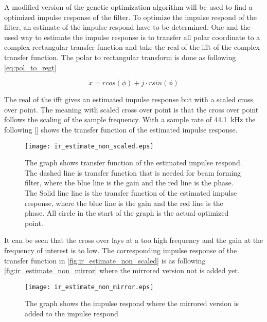  A modified version of the genetic optimization algorithm will be used to find a optimized impulse response of the filter. To optimize the impulse respond of the filter, an estimate of the impulse respond have to be determined. One and the used way to estimate the impulse response is to transfer all polar coordinate to a complex rectangular transfer function and take the real of the \gls{ifft} of the complex transfer function. The polar to rectangular transform is done as following \autoref{eq:pol_to_regt}

\begin{equation}\label{eq:pol_to_regt}
x=rcos(\phi)+j \cdot rsin(\phi)
\end{equation}


     \startexplain
    \stopexplain

The real of the \gls{ifft} gives an estimated impulse response but with a scaled cross over point. The meaning with scaled cross over point is that the cross over point follows the scaling of the sample frequency. With a sample rate of \SI{44.1}{\kilo\hertz} the following  \autoref{} shows the transfer function of the estimated impulse response. 

\begin{figure}[H]
	\centering
	\texttt{[image: ir\_estimate\_non\_scaled.eps]}
	\caption{The graph shows transfer function of the estimated impulse respond. The dashed line is transfer function that is needed for beam forming filter, where the blue line is the gain and the red line is the phase. The Solid line line is the transfer function of the estimated impulse response, where the blue line is the gain and the red line is the phase. All circle in the start of the graph is the actual optimized point.}
		\label{fig:ir_estimate_non_scaled}
\end{figure}


It can be seen that the cross over lays at a too high frequency and the gain at the frequency of interest is to low. The corresponding impulse response of the transfer function in \autoref{fig:ir_estimate_non_scaled} is as following \autoref{fig:ir_estimate_non_mirror} where the mirrored version not is added yet. 

\begin{figure}[H]
	\centering
	\texttt{[image: ir\_estimate\_non\_mirror.eps]}
	\caption{The graph shows the impulse respond where the mirrored version is added to the impulse respond}
		\label{fig:ir_estimate_non_mirror}
\end{figure}

